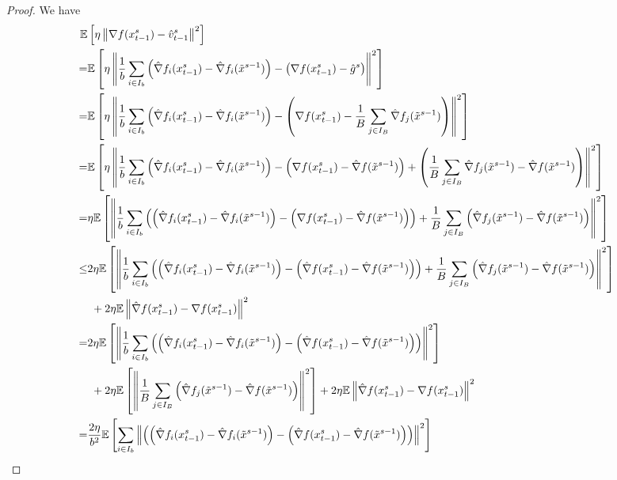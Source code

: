 \documentclass{article}
\newcommand*{\E}{\mathbb{E}}
\newcommand{\norm}[1]{\left\lVert#1\right\rVert}
\theoremstyle{definition}
\theoremstyle{remark}
\begin{document}
\begin{proof}
We have
\begin{align}
  \E&\left[\eta\norm{\nabla f(x_{t-1}^s)-{\hat{v}_{t-1}^s}}^2\right]\notag\\
   =&\E\left[\eta\norm{\frac{1}{b}\sum_{i\in I_b}\left(\hat{\nabla} f_i(x_{t-1}^s)-\hat{\nabla} f_i(\tilde{x}^{s-1})\right) - \left(\nabla f(x_{t-1}^s)-\hat{g}^s\right)}^2\right]\notag\\
   =&\E\left[\eta\norm{\frac{1}{b}\sum_{i\in I_b}\left(\hat{\nabla} f_i(x_{t-1}^s)-\hat{\nabla} f_i(\tilde{x}^{s-1})\right) - \left(\nabla f(x_{t-1}^s)-\frac{1}{B}\sum_{j\in I_B}\hat{\nabla} f_j(\tilde{x}^{s-1})\right)}^2\right]\notag\\
   =&\notag\E\left[\eta\norm{\frac{1}{b}\sum_{i\in I_b}\left(\hat{\nabla} f_i(x_{t-1}^s)-\hat{\nabla} f_i(\tilde{x}^{s-1})\right) - \left(\nabla f(x_{t-1}^s) - \hat{\nabla} f(\tilde{x}^{s-1}) \right)+ \left(\frac{1}{B}\sum_{j\in I_B}\hat{\nabla} f_j(\tilde{x}^{s-1}) - \hat{\nabla} f(\tilde{x}^{s-1})\right)}^2\right]\\
   =&\notag\eta\E\left[\norm{\frac{1}{b}\sum_{i\in I_b}\left(\left(\hat{\nabla} f_i(x_{t-1}^s)-\hat{\nabla} f_i(\tilde{x}^{s-1})\right) - \left(\nabla f(x_{t-1}^s) - \hat{\nabla} f(\tilde{x}^{s-1}) \right)\right)+ \frac{1}{B}\sum_{j\in I_B}\left(\hat{\nabla} f_j(\tilde{x}^{s-1}) - \hat{\nabla} f(\tilde{x}^{s-1})\right)}^2\right]\\
   \leq &\notag2\eta\E\left[\norm{\frac{1}{b}\sum_{i\in I_b}\left(\left(\hat{\nabla} f_i(x_{t-1}^s)-\hat{\nabla} f_i(\tilde{x}^{s-1})\right) - \left(\hat{\nabla} f(x_{t-1}^s) - \hat{\nabla} f(\tilde{x}^{s-1}) \right)\right)+ \frac{1}{B}\sum_{j\in I_B}\left(\hat{\nabla} f_j(\tilde{x}^{s-1}) - \hat{\nabla} f(\tilde{x}^{s-1})\right)}^2\right]\\
   &\,\, + 2\eta \E \norm{\hat{\nabla} f(x_{t-1}^s)-\nabla f(x_{t-1}^s)}^2\label{var-estimate-lem-1}\\
    = &\notag 2 \eta\E\left[\norm{\frac{1}{b}\sum_{i\in I_b}\left(\left(\hat{\nabla} f_i(x_{t-1}^s)-\hat{\nabla} f_i(\tilde{x}^{s-1})\right) - \left(\hat{\nabla} f(x_{t-1}^s) - \hat{\nabla} f(\tilde{x}^{s-1}) \right)\right)}^2\right]\\
   &\,\, +2 \eta \E \left[ \norm{\frac{1}{B}\sum_{j\in I_B}\left(\hat{\nabla} f_j(\tilde{x}^{s-1}) - \hat{\nabla} f(\tilde{x}^{s-1})\right)}^2\right]+ 2\eta \E \norm{\hat{\nabla} f(x_{t-1}^s)-\nabla f(x_{t-1}^s)}^2\label{var-estimate-lem-2}\\
   = &\notag\frac{2\eta}{b^2}\E\left[\sum_{i\in I_b}\norm{\left(\left(\hat{\nabla} f_i(x_{t-1}^s)-\hat{\nabla} f_i(\tilde{x}^{s-1})\right) - \left({\hat{\nabla}} f(x_{t-1}^s) - \hat{\nabla} f(\tilde{x}^{s-1}) \right)\right)}^2\right]\\

\end{align}
\end{proof}
\end{document}
